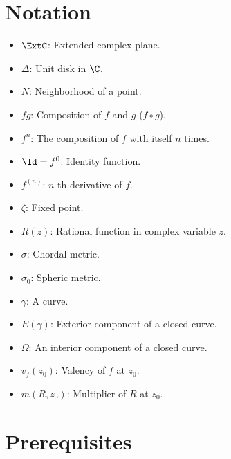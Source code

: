 \maketitle

\chapter*{Notation}
\begin{itemize}
    \item $\ExtC$: Extended complex plane.
    \item $\Delta$: Unit disk in $\C$.
    \item $N$: Neighborhood of a point.
    \item $fg$: Composition of $f$ and $g$ ($f \circ g$).
    \item $f^n$: The composition of $f$ with itself $n$ times.
    \item $\Id = f^0$: Identity function.
    \item $f^{(n)}$: $n$-th derivative of $f$.
    \item $\zeta$: Fixed point.
    \item $R(z)$: Rational function in complex variable $z$.
    \item $\sigma$: Chordal metric.
    \item $\sigma_0$: Spheric metric.
    \item $\gamma$: A curve.
    \item $E(\gamma)$: Exterior component of a closed curve.
    \item $\Omega$: An interior component of a closed curve.
    \item $v_f(z_0)$: Valency of $f$ at $z_0$.
    \item $m(R, z_0)$: Multiplier of $R$ at $z_0$.
\end{itemize}

\chapter*{Prerequisites}

